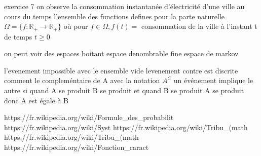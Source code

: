 \documentclass{article}
\begin{document}
exercice 7
on observe la consommation instantanée d'électricité d'une ville au cours du temps
l'ensemble des functions defines pour la parte naturelle
$\Omega = \{ f : \mathbb{R}_{+} \to \mathbb{R}_{+} \}$ où pour $f \in \Omega, f(t) =$ consommation de la ville à l'instant t de temps $t\geq 0$

on peut voir des espaces boitant espace denombrable fine
espace de markov

l'evenement impossible avec le ensemble vide
levenement contre est discrite comment le compleméntaire de A avec la notation $A^{C}$
un événement implique le autre si quand A se produit B se produit et quand B se produit A se produit donc A est égale à B

https://fr.wikipedia.org/wiki/Formule_des_probabilit%
https://fr.wikipedia.org/wiki/Syst%
https://fr.wikipedia.org/wiki/Tribu_(math%
https://fr.wikipedia.org/wiki/Tribu_(math%
https://fr.wikipedia.org/wiki/Fonction_caract%
\end{document}
